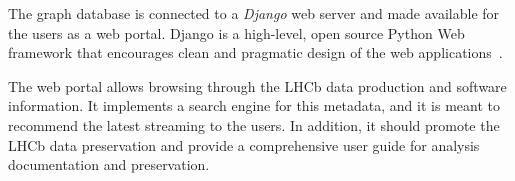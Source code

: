 The graph database is connected to a \emph{Django} web server and made available for the users as a web portal. Django is a high-level, open source Python Web framework that encourages clean and pragmatic design of the web applications~\cite{holovaty2009definitive}.

The web portal allows browsing through the LHCb data production and software information. It implements a search engine for this metadata, and it is meant to recommend the latest streaming to the users. In addition, it should promote the LHCb data preservation and provide a comprehensive user guide for analysis documentation and preservation.

